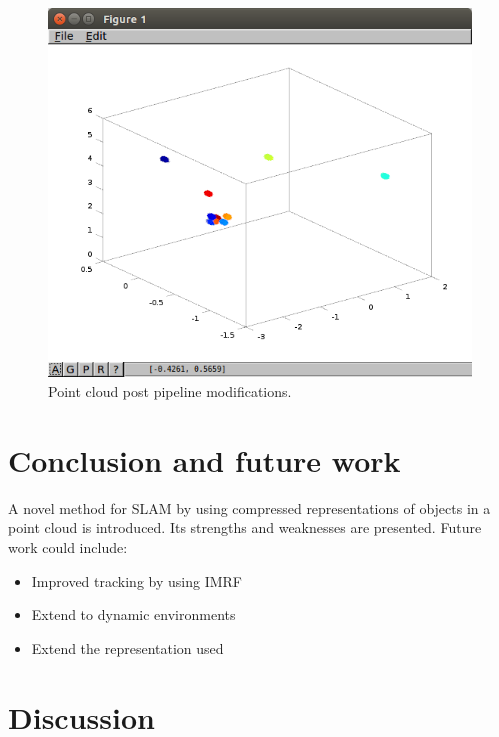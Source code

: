\documentclass[twoside,hidelinks]{article}
\begin{document}
\begin{figure}[h!]
  \centering
    \includegraphics[width=.5\textwidth]{landmarkClasification}
    \caption{Point cloud post pipeline modifications.}
  \label{pcl:features}
\end{figure}

\section{Conclusion and future work}
\label{sec:discussion}

A novel method for SLAM by using compressed representations of objects in a point cloud is introduced. Its strengths and weaknesses are presented. Future work could include:
\begin{itemize}
    \item Improved tracking by using IMRF
    \item Extend to dynamic environments
    \item Extend the representation used
\end{itemize}

\section{Discussion}
\end{document}
